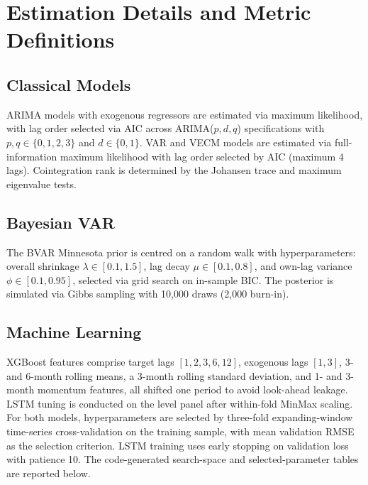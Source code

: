 \documentclass[12pt,a4paper]{article}
\begin{document}
\appendix

\section{Estimation Details and Metric Definitions}

\subsection{Classical Models}

ARIMA models with exogenous regressors are estimated via maximum likelihood, with lag order selected via AIC across ARIMA($p,d,q$) specifications with $p, q \in \{0,1,2,3\}$ and $d \in \{0,1\}$. VAR and VECM models are estimated via full-information maximum likelihood with lag order selected by AIC (maximum 4 lags). Cointegration rank is determined by the Johansen trace and maximum eigenvalue tests.

\subsection{Bayesian VAR}

The BVAR Minnesota prior is centred on a random walk with hyperparameters: overall shrinkage $\lambda \in [0.1, 1.5]$, lag decay $\mu \in [0.1, 0.8]$, and own-lag variance $\phi \in [0.1, 0.95]$, selected via grid search on in-sample BIC. The posterior is simulated via Gibbs sampling with 10,000 draws (2,000 burn-in).

\subsection{Machine Learning}

XGBoost features comprise target lags $[1, 2, 3, 6, 12]$, exogenous lags $[1, 3]$, 3- and 6-month rolling means, a 3-month rolling standard deviation, and 1- and 3-month momentum features, all shifted one period to avoid look-ahead leakage. LSTM tuning is conducted on the level panel after within-fold MinMax scaling. For both models, hyperparameters are selected by three-fold expanding-window time-series cross-validation on the training sample, with mean validation RMSE as the selection criterion. LSTM training uses early stopping on validation loss with patience 10. The code-generated search-space and selected-parameter tables are reported below.


\end{document}
